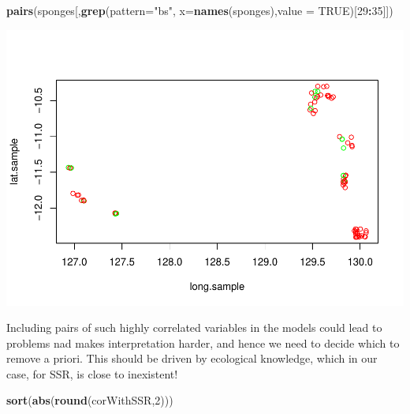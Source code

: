 \documentclass[
]{book}
\newenvironment{Shaded}{\begin{snugshade}}{\end{snugshade}}
\newcommand{\AttributeTok}[1]{\textcolor[rgb]{0.13,0.29,0.53}{#1}}
\newcommand{\ConstantTok}[1]{\textcolor[rgb]{0.56,0.35,0.01}{#1}}
\newcommand{\DecValTok}[1]{\textcolor[rgb]{0.00,0.00,0.81}{#1}}
\newcommand{\FunctionTok}[1]{\textcolor[rgb]{0.13,0.29,0.53}{\textbf{#1}}}
\newcommand{\NormalTok}[1]{#1}
\newcommand{\SpecialCharTok}[1]{\textcolor[rgb]{0.81,0.36,0.00}{\textbf{#1}}}
\newcommand{\StringTok}[1]{\textcolor[rgb]{0.31,0.60,0.02}{#1}}
\begin{document}
\begin{Shaded}
\begin{Highlighting}[]
\FunctionTok{pairs}\NormalTok{(sponges[,}\FunctionTok{grep}\NormalTok{(}\AttributeTok{pattern=}\StringTok{"bs"}\NormalTok{, }\AttributeTok{x=}\FunctionTok{names}\NormalTok{(sponges),}\AttributeTok{value =} \ConstantTok{TRUE}\NormalTok{)[}\DecValTok{29}\SpecialCharTok{:}\DecValTok{35}\NormalTok{]])}
\end{Highlighting}
\end{Shaded}

\includegraphics{ECOMODbook_files/figure-latex/unnamed-chunk-69-3.pdf}

Including pairs of such highly correlated variables in the models could lead to problems nad makes interpretation harder, and hence we need to decide which to remove a priori. This should be driven by ecological knowledge, which in our case, for SSR, is close to inexistent!

\begin{Shaded}
\begin{Highlighting}[]
\FunctionTok{sort}\NormalTok{(}\FunctionTok{abs}\NormalTok{(}\FunctionTok{round}\NormalTok{(corWithSSR,}\DecValTok{2}\NormalTok{)))}
\end{Highlighting}
\end{Shaded}
\end{document}
